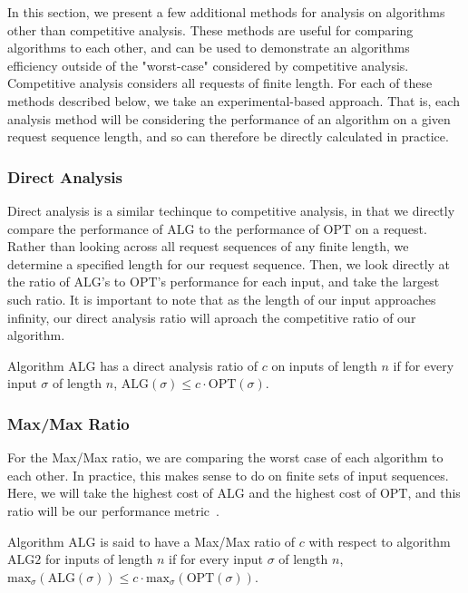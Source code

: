 In this section, we present a few additional methods for analysis on algorithms other than competitive analysis. These methods are useful for comparing algorithms to each other, and can be used to demonstrate an algorithms efficiency outside of the "worst-case" considered by competitive analysis. Competitive analysis considers all requests of finite length. For each of these methods described below, we take an experimental-based approach. That is, each analysis method will be considering the performance of an algorithm on a given request sequence length, and so can therefore be directly calculated in practice.

\subsubsection*{Direct Analysis}
\label{sec:Direct}
Direct analysis is a similar techinque to competitive analysis, in that we directly compare the performance of $\mathrm{ALG}$ to the performance of $\mathrm{OPT}$ on a request. Rather than looking across all request sequences of any finite length, we determine a specified length for our request sequence. Then, we look directly at the ratio of $\mathrm{ALG}$'s to $\mathrm{OPT}$'s performance for each input, and take the largest such ratio. It is important to note that as the length of our input approaches infinity, our direct analysis ratio will aproach the competitive ratio of our algorithm.

\begin{definition}
    \label{def:direct}
    Algorithm $\mathrm{ALG}$ has a direct analysis ratio of $c$ on inputs of length $n$ if for every input $\sigma$ of length $n$, $\mathrm{ALG}(\sigma) \leq c\cdot \mathrm{OPT}(\sigma)$.
\end{definition}

\subsubsection*{Max/Max Ratio}
\label{sec:MaxMax}
For the Max/Max ratio, we are comparing the worst case of each algorithm to each other. In practice, this makes sense to do on finite sets of input sequences. Here, we will take the highest cost of $\mathrm{ALG}$ and the highest cost of $\mathrm{OPT}$, and this ratio will be our performance metric~\cite{MAXMAX2005}. 

\begin{definition}
    Algorithm $\mathrm{ALG}$ is said to have a Max/Max ratio of $c$ with respect to algorithm $\mathrm{ALG}2$ for inputs of length $n$ if for every input $\sigma$ of length $n$, $\mathrm{max}_{\sigma}(\mathrm{ALG}(\sigma)) \leq c\cdot \mathrm{max}_{\sigma}(\mathrm{OPT}(\sigma))$.
\end{definition}

